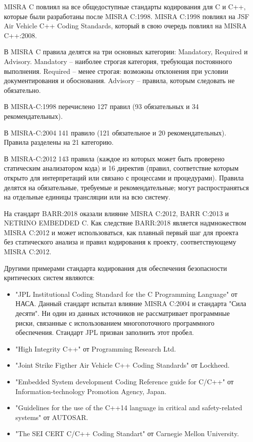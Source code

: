 MISRA C повлиял на все общедоступные стандарты кодирования для C и C++, которые были разработаны после MISRA 
C:1998. MISRA C:1998 повлиял на JSF Air Vehicle C++ Coding Standards\cite{JSF}, который в свою очередь повлиял на MISRA C++:2008.

В MISRA C правила делятся на три основных категории: Mandatory, Required и Advisory. Mandatory --
наиболее строгая категория, требующая постоянного выполнения. Required -- менее строгая: возможны 
отклонения при условии документирования и обоснования. Advisory -- правила, которым следовать 
не обязательно.

В MISRA-C:1998 перечислено 127 правил (93 обязательных и 34 рекомендательных).

В MISRA-C:2004 141 правило (121 обязательное и 20 рекомендательных). Правила разделены на 21 категорию.

В MISRA-C:2012 143 правила (каждое из которых может быть проверено статическим анализатором кода) и 16 директив 
(правил, соответствие которым открыто для интерпретаций или связано с процессами и процедурами). Правила делятся 
на обязательные, требуемые и рекомендательные; могут распространяться на отдельные единицы трансляции или на всю 
систему.

На стандарт BARR:2018 оказали влияние MISRA C:2012, BARR C:2013 и NETRINO EMBEDDED C. Как следствие BARR:2018 является 
надмножеством MISRA C:2012 и может использоваться, как плавный первый шаг для проекта без статического анализа и правил кодирования 
к проекту, соответствующему MISRA C:2012.

Другими примерами стандарта кодирования для обеспечения безопасности критических систем являются:
\begin{itemize}
    \item "JPL Institutional Coding Standard for the C Programming Language"\cite{JPL} от НАСА. Данный стандарт испытал влияние MISRA C:2004 и 
        стандарта "Сила десяти"\cite{powerOfTen}. Ни один из данных источников не рассматривает программные риски, связанные с использованием 
        многопоточного программного обеспечения. Стандарт JPL  призван заполнить этот пробел.
    \item "High Integrity C++"\cite{highIntegrity} от Programming Research Ltd. 
    \item "Joint Strike Figther Air Vehicle C++ Coding Standards"\cite{JSF} от Lockheed.
    \item "Embedded System development Coding Reference guide for C/C++"\cite{escrC, escrCPP} от Information-technology Promotion Agency, Japan.
    \item "Guidelines for the use of the C++14 language in critical and safety-related systems"\cite{autosar} от AUTOSAR.
    \item "The SEI CERT C/C++ Coding Standart" от Carnegie Mellon University\cite{CERT}. 
\end{itemize}

